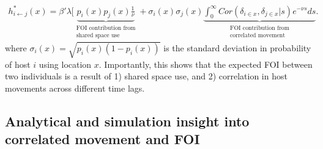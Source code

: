 \documentclass[letterpaper]{article}
\begin{document}
\begin{equation}
    \begin{aligned}
    h^*_{i \leftarrow j}(x) = \beta' \lambda [ \underbrace{p_i(x)p_j(x) \frac{1}{\nu}}_{\substack{\text{FOI contribution from} \\ \text{shared space use}}} + \sigma_i(x) \sigma_j(x) \underbrace{\int_{0}^{\infty} Cor(\delta_{i \in x}, \delta_{j \in x} | s) e^{-\nu s} ds}_{\substack{\text{FOI contribution from} \\ \text{correlated movement}}}.
    \end{aligned}
    \label{eq:stationary_cor}
\end{equation}
where $\sigma_i(x) = \sqrt{p_i(x)(1 - p_i(x))}$  is the standard deviation in probability of host $i$ using location $x$.  Importantly, this shows that the expected FOI between two individuals is a result of 1) shared space use, and 2) correlation in host movements across different time lags.  %

\subsection*{Analytical and simulation insight into correlated movement and FOI}
\end{document}
